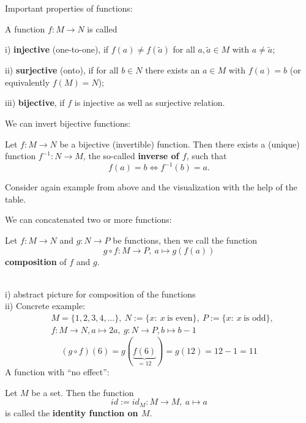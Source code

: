  
\begin{frame}
Important properties of functions: \vspace{-0.3cm}
\begin{defi} \label{def:injective_surjective_bijective}
	A function 	$f: M\to N$ is called
	\ite
	\item[i)] \textbf{injective} (one-to-one), if $f(a)\not=f(\tilde a)$ for all $a,\tilde a\in M$ with $a\not=\tilde a$;
	\item[ii)] \textbf{surjective} (onto), if for all $b\in N$ there exists an $a\in M$ with $f(a)=b$ (or equivalently $f(M)=N$);
	\item[iii)] \textbf{bijective}, if $f$ is injective as well as surjective  relation.
	\eti 
\end{defi}
%
\vspace{0.3cm}
We can invert bijective functions:\vspace{-0.3cm}
\begin{defi} \label{def:composition}
	Let $f\colon M\to N$ be a bijective (invertible) function. Then there exists a (unique) function $f^{-1}\colon N \to M$, the so-called \textbf{inverse of $f$}, such that
	$$f(a) = b \iff f^{-1}(b) = a.$$ 
\end{defi}
%
\vspace{0.3cm}
\begin{ex}
	\blank
 Consider again example from above and the visualization with the help of the table.
\end{ex}
\end{frame}

\begin{frame}
\vspace{0.3cm}
We can concatenated two or more functions:\vspace{-0.3cm}
\begin{defi} \label{def:composition}
	Let $f\colon M\to N$ and $g\colon N\to P$ be functions, then we call the function
	$$g\circ f\colon M\to P,~ a \mapsto g(f(a))$$
	\textbf{composition} of $f$ and $g$. 
\end{defi}
%
{	\blank
	~\\
	i) abstract picture for composition of the functions\\
	ii) Concrete example:
	\begin{align*}
	&M=\{1,2,3,4,\dots\},~N:=\{x:~x~\text{is even}\},~P:=\{x:~x~\text{is odd}\},\\
	&f:M\rightarrow N, a\mapsto 2a,~g:N\rightarrow P, b\mapsto b-1
	\end{align*}
	$$
	(g\circ f)(6)=g(\underbrace{f(6)}_{=12})=g(12)=12-1=11
	$$
}
\noindent A function with ``no effect'':\vspace{-0.3cm}
\begin{defi} \label{def:identity}
	Let $M$ be a set. Then the function 
	$$id := id_M \colon M \to M, ~a\mapsto a $$
	is called the \textbf{identity function on $M$}.
\end{defi}

 \end{frame}





